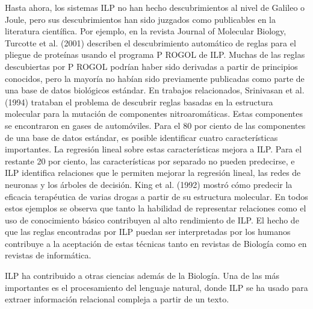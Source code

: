 \documentclass[12 pt, a4paper]{article}
\begin{document}
				Hasta ahora, los sistemas ILP no han hecho descubrimientos al nivel de Galileo o Joule, pero sus descubrimientos han sido juzgados como publicables en la literatura científica. Por ejemplo, en la revista Journal of Molecular Biology, Turcotte et al. (2001) describen el descubrimiento automático de reglas para el pliegue de proteínas usando el programa P ROGOL de ILP. Muchas de las reglas descubiertas por P ROGOL podrían haber sido derivadas a partir de principios conocidos, pero la mayoría no habían sido previamente publicadas como parte de una base de datos biológicos estándar. En trabajos relacionados, Srinivasan et al. (1994) trataban el problema de descubrir reglas basadas en la estructura molecular para la mutación de componentes nitroaromáticas. Estas componentes se encontraron en gases de automóviles. Para el 80 por ciento de las componentes de una base de datos estándar, es posible identificar cuatro características importantes. La regresión lineal sobre estas características mejora a ILP. Para el restante 20 por ciento, las características por separado no pueden predecirse, e ILP identifica relaciones que le permiten mejorar la regresión lineal, las redes de neuronas y los árboles de decisión. King et al. (1992) mostró cómo predecir la eficacia terapéutica de varias drogas a partir de su estructura molecular. En todos estos ejemplos se observa que tanto la habilidad de representar relaciones como el uso de conocimiento básico contribuyen al alto rendimiento de ILP. El hecho de que las reglas encontradas por ILP puedan ser interpretadas por los humanos contribuye a la aceptación de estas técnicas tanto en revistas de Biología como en revistas de informática.

				ILP ha contribuido a otras ciencias además de la Biología. Una de las más importantes es el procesamiento del lenguaje natural, donde ILP se ha usado para extraer información relacional compleja a partir de un texto. 

				
\end{document}
